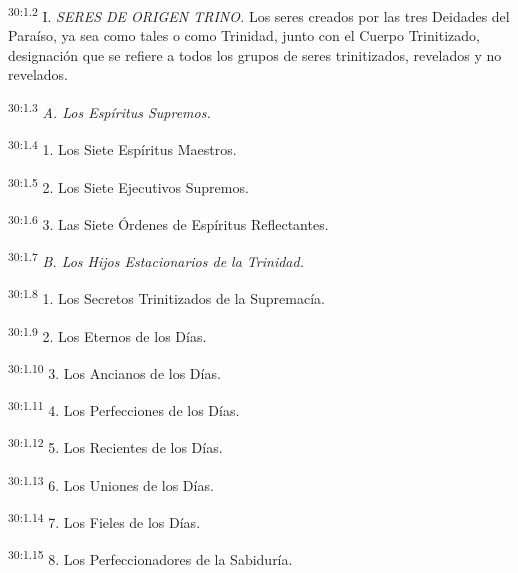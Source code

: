\par
\textsuperscript{30:1.2} I. \textit{SERES DE ORIGEN TRINO.} Los seres creados por las tres Deidades del Paraíso, ya sea como tales o como Trinidad, junto con el Cuerpo Trinitizado, designación que se refiere a todos los grupos de seres trinitizados, revelados y no revelados.

\par
\textsuperscript{30:1.3} \textit{A. Los Espíritus Supremos.}

\par
\textsuperscript{30:1.4} 1. Los Siete Espíritus Maestros.

\par
\textsuperscript{30:1.5} 2. Los Siete Ejecutivos Supremos.

\par
\textsuperscript{30:1.6} 3. Las Siete Órdenes de Espíritus Reflectantes.

\par
\textsuperscript{30:1.7} \textit{B. Los Hijos Estacionarios de la Trinidad.}

\par
\textsuperscript{30:1.8} 1. Los Secretos Trinitizados de la Supremacía.

\par
\textsuperscript{30:1.9} 2. Los Eternos de los Días.

\par
\textsuperscript{30:1.10} 3. Los Ancianos de los Días.

\par
\textsuperscript{30:1.11} 4. Los Perfecciones de los Días.

\par
\textsuperscript{30:1.12} 5. Los Recientes de los Días.

\par
\textsuperscript{30:1.13} 6. Los Uniones de los Días.

\par
\textsuperscript{30:1.14} 7. Los Fieles de los Días.

\par
\textsuperscript{30:1.15} 8. Los Perfeccionadores de la Sabiduría.


